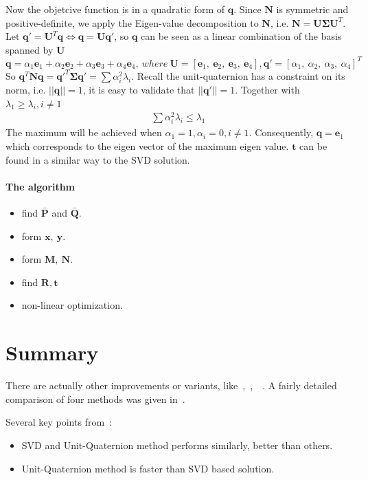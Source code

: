 \documentclass[a4paper]{report}
\begin{document}
Now the objetcive function is in a quadratic form of $\mathbf{q}$. Since $\mathbf{N}$ is symmetric and positive-definite, we apply the Eigen-value decomposition to $\mathbf{N}$, i.e. $\mathbf{N}=\mathbf{U}\mathbf{\Sigma}\mathbf{U}^T$. Let $\mathbf{q}'=\mathbf{U}^T\mathbf{q} \Leftrightarrow \mathbf{q}=\mathbf{U}\mathbf{q}'$, so $\mathbf{q}$ can be seen as a linear combination of the basis spanned by $\mathbf{U}$
$$
\mathbf{q}=\alpha_1 \mathbf{e}_1 + \alpha_2 \mathbf{e}_2+\alpha_3 \mathbf{e}_3+\alpha_4 \mathbf{e}_4,\ where\ \mathbf{U}=[\mathbf{e}_1,\ \mathbf{e}_2,\ \mathbf{e}_3,\ \mathbf{e}_4], \mathbf{q}'=[\alpha_1,\ \alpha_2,\ \alpha_3,\ \alpha_4]^T
$$ 
So $\mathbf{q}^T\mathbf{Nq}=\mathbf{q}'^T\mathbf{\Sigma q}'=\sum \alpha_i^2 \lambda_i$. Recall the unit-quaternion has a constraint on its norm, i.e. $||\mathbf{q}||=1$, it is easy to validate that $||\mathbf{q}'||=1$. Together with $\lambda_1 \geq \lambda_i, i \neq 1$
\begin{align*}
\sum \alpha_i^2 \lambda_i \leq \lambda_1
\end{align*}
The maximum will be achieved when $\alpha_1=1, \alpha_i=0, i\neq 1$. Consequently, $\mathbf{q}=\mathbf{e}_1$ which corresponds to the eigen vector of the maximum eigen value. $\mathbf{t}$ can be found in a similar way to the SVD solution.
\paragraph{The algorithm}
\begin{itemize}
	\item find $\bar{\mathbf{P}}$ and $\bar{\mathbf{Q}}$.
	\item form $\mathbf{x},\ \mathbf{y}$.
	\item form $\mathbf{M},\ \mathbf{N}$.
	\item find $\mathbf{R, t}$
	\item non-linear optimization.
\end{itemize}

\section{Summary}
There are actually other improvements or variants, like~\cite{291441},~\cite{Horn88},~\cite{Umeyama:1991:LET:105514.105525}~\cite{Walker:1991:ELP:119076.119080}. A fairly detailed comparison of four methods was given in~\cite{Eggert1997}. 

Several key points from~\cite{Eggert1997}:
\begin{itemize}
\item SVD and Unit-Quaternion method performs similarly, better than others.
\item Unit-Quaternion method is faster than SVD based solution.
\end{itemize}
\end{document}
